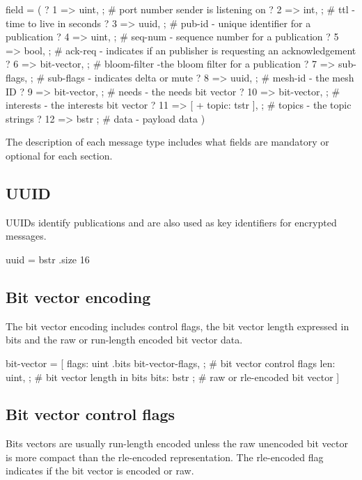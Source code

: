 \begin{DoxyVerb}field = (
  ? 1 => uint,               ; # port number sender is listening on
  ? 2 => int,                ; # ttl - time to live in seconds
  ? 3 => uuid,               ; # pub-id - unique identifier for a publication
  ? 4 => uint,               ; # seq-num - sequence number for a publication
  ? 5 => bool,               ; # ack-req - indicates if an publisher is requesting an acknowledgement
  ? 6 => bit-vector,         ; # bloom-filter -the bloom filter for a publication
  ? 7 => sub-flags,          ; # sub-flags - indicates delta or mute
  ? 8 => uuid,               ; # mesh-id - the mesh ID
  ? 9 => bit-vector,         ; # needs - the needs bit vector
  ? 10 => bit-vector,        ; # interests - the interests bit vector
  ? 11 => [ + topic: tstr ], ; # topics - the topic strings
  ? 12 => bstr               ; # data - payload data
)
\end{DoxyVerb}


The description of each message type includes what fields are mandatory or optional for each section.\hypertarget{message-types-and-flow_uuid}{}\subsection{U\+U\+ID}\label{message-types-and-flow_uuid}
U\+U\+I\+Ds identify publications and are also used as key identifiers for encrypted messages.

\begin{DoxyVerb}uuid = bstr .size 16
\end{DoxyVerb}
\hypertarget{message-types-and-flow_bit-vector-encoding}{}\subsection{Bit vector encoding}\label{message-types-and-flow_bit-vector-encoding}
The bit vector encoding includes control flags, the bit vector length expressed in bits and the raw or run-\/length encoded bit vector data.

\begin{DoxyVerb}bit-vector = [
  flags: uint .bits bit-vector-flags, ; # bit vector control flags
  len: uint,                          ; # bit vector length in bits
  bits: bstr                          ; # raw or rle-encoded bit vector
]
\end{DoxyVerb}
\hypertarget{message-types-and-flow_bit-vector-control-flags}{}\subsection{Bit vector control flags}\label{message-types-and-flow_bit-vector-control-flags}
Bits vectors are usually run-\/length encoded unless the raw unencoded bit vector is more compact than the rle-\/encoded representation. The rle-\/encoded flag indicates if the bit vector is encoded or raw.

